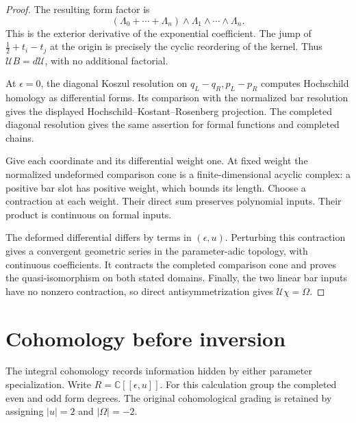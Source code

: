 \begin{proof}
The resulting form factor is
\[
 (\Lambda_0+\cdots+\Lambda_n)
       \wedge\Lambda_1\wedge\cdots\wedge\Lambda_n.
\]
This is the exterior derivative of the exponential coefficient.
The jump of $\tfrac12+t_i-t_j$ at the origin is precisely
the cyclic reordering of the kernel. Thus
$\mathcal U B=d\mathcal U$, with no additional factorial.

At $\epsilon=0$, the diagonal Koszul resolution on
$q_L-q_R,p_L-p_R$ computes Hochschild homology as differential
forms. Its comparison with the normalized bar resolution gives
the displayed Hochschild--Kostant--Rosenberg projection.
The completed diagonal resolution gives the same assertion
for formal functions and completed chains.

Give each coordinate and its differential weight one.
At fixed weight the normalized undeformed comparison cone is
a finite-dimensional acyclic complex: a positive bar slot has
positive weight, which bounds its length. Choose a contraction
at each weight. Their direct sum preserves polynomial inputs.
Their product is continuous on formal inputs.

The deformed differential differs by terms in $(\epsilon,u)$.
Perturbing this contraction gives a convergent geometric series
in the parameter-adic topology, with continuous coefficients.
It contracts the completed comparison cone and proves the
quasi-isomorphism on both stated domains.
Finally, the two linear bar inputs have no nonzero contraction,
so direct antisymmetrization gives $\mathcal U\chi=\Omega$.
\end{proof}

\section{Cohomology before inversion}

The integral cohomology records information hidden by either
parameter specialization. Write $R=\mathbb C[[\epsilon,u]]$.
For this calculation group the completed even and odd form
degrees. The original cohomological grading is retained by
assigning $|u|=2$ and $|\Omega|=-2$.

